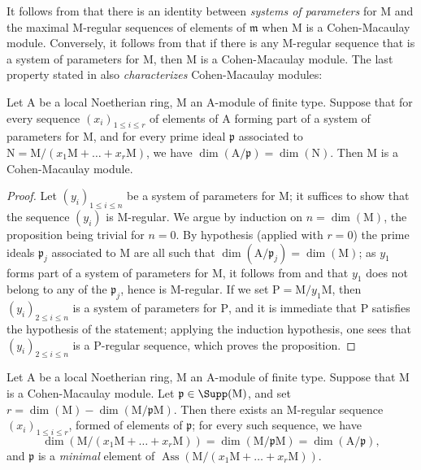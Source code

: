 \begin{remark}[16.5.7]
\label{0.16.5.7}
It follows from  that there is an identity between \emph{systems of parameters} for $\mathrm{M}$ and the maximal $\mathrm{M}$-regular sequences of elements of $\mathfrak{m}$ when $\mathrm{M}$ is a Cohen-Macaulay module.
Conversely, it follows from  that if there is any $\mathrm{M}$-regular sequence that is a system of parameters for $\mathrm{M}$, then $\mathrm{M}$ is a Cohen-Macaulay module.
The last property stated in  also \emph{characterizes} Cohen-Macaulay modules:
\end{remark}

\begin{proposition}[16.5.8]
\label{0.16.5.8}
Let $\mathrm{A}$ be a local Noetherian ring, $\mathrm{M}$ an $\mathrm{A}$-module of finite type.
Suppose that for every sequence $(x_i)_{1\leq i\leq r}$ of elements of $\mathrm{A}$ forming part of a system of parameters for $\mathrm{M}$, and for every prime ideal $\mathfrak{p}$ associated to $\mathrm{N}=\mathrm{M}/(x_1\mathrm{M}+\ldots+x_r\mathrm{M})$, we have $\dim(\mathrm{A}/\mathfrak{p})=\dim(\mathrm{N})$.
Then $\mathrm{M}$ is a Cohen-Macaulay module.
\end{proposition}

\begin{proof}
Let $(y_i)_{1\leq i\leq n}$ be a system of parameters for $\mathrm{M}$; it suffices to show that the sequence $(y_i)$ is $\mathrm{M}$-regular.
We argue by induction on $n=\dim(\mathrm{M})$, the proposition being trivial for $n=0$.
By hypothesis (applied with $r=0$) the prime ideals $\mathfrak{p}_j$ associated to $\mathrm{M}$ are all such that $\dim(\mathrm{A}/\mathfrak{p}_j)=\dim(\mathrm{M})$; as $y_1$ forms part of a system of parameters
for $\mathrm{M}$, it follows from  and  that $y_1$ does not belong to any of the $\mathfrak{p}_j$, hence is $\mathrm{M}$-regular.
If we set $\mathrm{P}=\mathrm{M}/y_1\mathrm{M}$, then $(y_i)_{2\leq i\leq n}$ is a system of parameters for $\mathrm{P}$, and it is immediate that $\mathrm{P}$ satisfies the hypothesis of the statement; applying the induction hypothesis, one sees that $(y_i)_{2\leq i\leq n}$ is a $\mathrm{P}$-regular sequence, which proves the proposition.
\end{proof}

\begin{proposition}[16.5.9]
\label{0.16.5.9}
Let $\mathrm{A}$ be a local Noetherian ring, $\mathrm{M}$ an $\mathrm{A}$-module of finite type.
Suppose that $\mathrm{M}$ is a Cohen-Macaulay module.
Let $\mathfrak{p}\in\Supp(\mathrm{M})$, and set $r=\dim(\mathrm{M})-\dim(\mathrm{M}/\mathfrak{p}\mathrm{M})$.
Then there exists an $\mathrm{M}$-regular sequence $(x_i)_{1\leq i\leq r}$, formed of elements of $\mathfrak{p}$; for every such sequence, we have
\[
  \dim(\mathrm{M}/(x_1\mathrm{M}+\ldots+x_r\mathrm{M}))=\dim(\mathrm{M}/\mathfrak{p}\mathrm{M})=\dim(\mathrm{A}/\mathfrak{p}),
\]
and $\mathfrak{p}$ is a \emph{minimal} element of $\operatorname{Ass}(\mathrm{M}/(x_1\mathrm{M}+\ldots+x_r\mathrm{M}))$.
\end{proposition}

